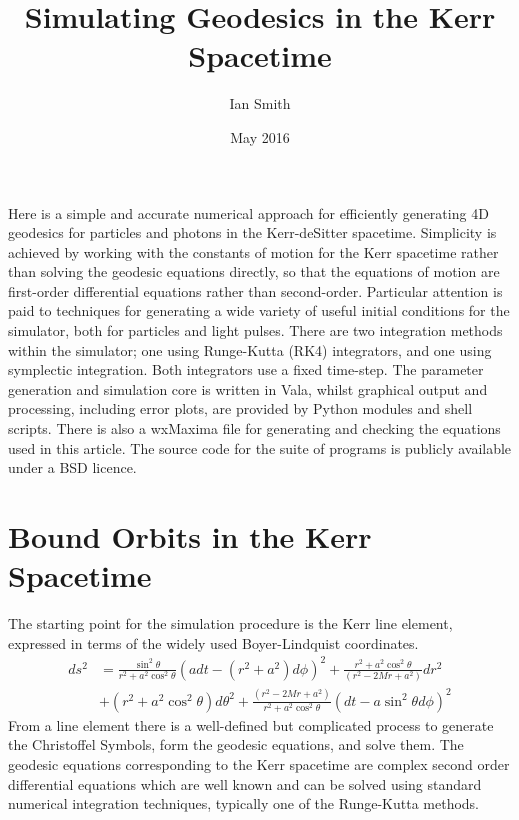 \documentclass[11pt]{article}
\title{\textbf{Simulating Geodesics in the Kerr Spacetime}}
\author{Ian Smith}
\date{May 2016}
\begin{document}
\maketitle

\abstract
Here is a simple and accurate numerical approach for efficiently generating 4D geodesics for particles and photons in the Kerr-deSitter spacetime.
Simplicity is achieved by working with the constants of motion for the Kerr spacetime rather than solving the geodesic equations directly, so that the equations of motion are first-order differential equations rather than second-order.
Particular attention is paid to techniques for generating a wide variety of useful initial conditions for the simulator, both for particles and light pulses.
There are two integration methods within the simulator; one using Runge-Kutta (RK4) integrators, and one using symplectic integration.
Both integrators use a fixed time-step.
The parameter generation and simulation core is written in Vala, whilst graphical output and processing, including error plots, are provided by Python modules and shell scripts.
There is also a wxMaxima file for generating and checking the equations used in this article.
The source code for the suite of programs is publicly available under a BSD licence.

\section{Bound Orbits in the Kerr Spacetime}

The starting point for the simulation procedure is the Kerr line element, expressed in terms of the widely used Boyer-Lindquist coordinates.
\begin{equation}
\begin{aligned}
d s^2 &= \frac{ \sin^2 \theta } {r^2 + a^2 \cos^2 \theta} (a dt - (r^2 + a^2)d \phi )^2 + \frac{ r^2 + a^2 \cos^2 \theta } {(r^2 - 2Mr  + a^2)} d r^2 \\
&+ (r^2 + a^2 \cos^2 \theta) d \theta^2 + \frac{ (r^2 - 2Mr  + a^2) } {r^2 + a^2 \cos^2 \theta} (dt - a \sin^2 \theta d \phi )^2
\end{aligned}
\end{equation}
From a line element there is a well-defined but complicated process to generate the Christoffel Symbols, form the geodesic equations, and solve them.
The geodesic equations corresponding to the Kerr spacetime are complex second order differential equations which are well known and can be solved using standard numerical integration techniques, typically one of the Runge-Kutta methods.
\end{document}
